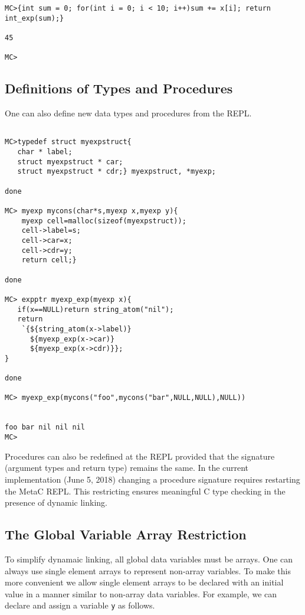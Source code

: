 \documentclass{article}
\begin{document}
\begin{verbatim}
MC>{int sum = 0; for(int i = 0; i < 10; i++)sum += x[i]; return int_exp(sum);}

45

MC>
\end{verbatim}

\subsection{Definitions of Types and Procedures}

One can also define new data types and procedures from the REPL.

\begin{verbatim}

MC>typedef struct myexpstruct{
   char * label;
   struct myexpstruct * car;
   struct myexpstruct * cdr;} myexpstruct, *myexp;

done

MC> myexp mycons(char*s,myexp x,myexp y){
    myexp cell=malloc(sizeof(myexpstruct));
    cell->label=s;
    cell->car=x;
    cell->cdr=y;
    return cell;}

done

MC> expptr myexp_exp(myexp x){
   if(x==NULL)return string_atom("nil");
   return
    `{${string_atom(x->label)}
      ${myexp_exp(x->car)}
      ${myexp_exp(x->cdr)}};
}

done

MC> myexp_exp(mycons("foo",mycons("bar",NULL,NULL),NULL))


foo bar nil nil nil
MC>
\end{verbatim}

Procedures can also be redefined at the REPL provided that the
signature (argument types and return type) remains the same.  In the
current implementation (June 5, 2018) changing a procedure signature
requires restarting the MetaC REPL.  This restricting ensures
meaningful C type checking in the presence of dynamic linking.

\subsection{The Global Variable Array Restriction}

To simplify dynamaic linking, all global data
variables must be arrays. One can always use single element
arrays to represent non-array variables.  To make this more convenient
we allow single element arrays to be declared with an initial value in a
manner similar to non-array data variables.  For example, we can declare and assign a variable {\tt y}
as follows.
\end{document}
